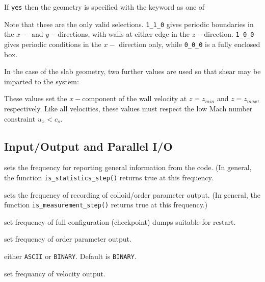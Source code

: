 
If \texttt{yes} then the geometry is specified with the keyword
as one of


Note that these are the only valid selections. \texttt{1\_1\_0}
gives periodic boundaries in the $x-$ and $y-$directions, with
walls at either edge in the $z-$direction. \texttt{1\_0\_0}
gives periodic conditions in the $x-$ direction only, while
\texttt{0\_0\_0} is a fully enclosed box.

In the case of the slab geometry, two further values are used so
that shear may be imparted to the system:



These values set the $x-$component of the wall velocity at
$z = z_{min}$ and $z = z_{max}$, respectively. Like all
velocities, these values must respect the low Mach number
constraint $u_x < c_s$.

\subsection{Input/Output and Parallel I/O}


sets the frequency for reporting general information from
the code. (In general, the function
 \texttt{is\_statistics\_step()} returns true at this frequency.


sets the frequency of recording of colloid/order parameter output.
(In general, the function \texttt{is\_measurement\_step()} returns
true at this frequency.)


set frequency of full configuration (checkpoint) dumps suitable
for restart.


set frequency of order parameter output.


either \texttt{ASCII} or \texttt{BINARY}. Default is \texttt{BINARY}.


set frequancy of velocity output.


